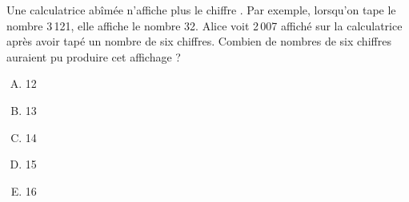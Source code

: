 Une calculatrice abîmée n'affiche plus le chiffre \fg. Par
exemple, lorsqu'on tape le nombre 3\,121, elle affiche le nombre
32. Alice voit 2\,007 affiché sur la calculatrice après avoir tapé un
nombre de six chiffres. Combien de nombres de six chiffres auraient pu
produire cet affichage ?
\begin{multicols}{5}
  \begin{enumerate}[A)]
  \item 12
  \item 13
  \item 14
  \item 15
  \item 16
  \end{enumerate}
\end{multicols}